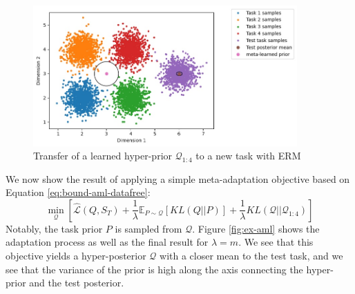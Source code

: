 \documentclass{article}
\theoremstyle{definition}
\newcommand{\Expect}[2]{\mathbb{E}_{#1}\left [#2 \right ]}
\begin{document}
\begin{figure}
	\centering
	\includegraphics[width=0.9\textwidth]{toy_example_erm.JPG}
	\caption{Transfer of a learned hyper-prior $\mathcal{Q}_{1:4}$ to a new task with ERM}
	\label{fig:ex-erm}
\end{figure}


We now show the result of applying a simple meta-adaptation objective based on Equation \ref{eq:bound-aml-datafree}: 
$$\min_{\mathcal{Q}}\left [\hat{\mathcal{L}}(Q, S_T) + \frac{1}{\lambda}\Expect{P\sim \mathcal{Q}}{KL(Q||P)}+\frac{1}{\lambda}KL(\mathcal{Q}||\mathcal{Q}_{1:4})\right ]$$
Notably, the task prior $P$ is sampled from $\mathcal{Q}$. Figure \ref{fig:ex-aml} shows the adaptation process as well as the final result for $\lambda=m$. We see that this objective yields a hyper-posterior $\mathcal{Q}$ with a closer mean to the test task, and we see that the variance of the prior is high along the axis connecting the hyper-prior and the test posterior. 
\end{document}
